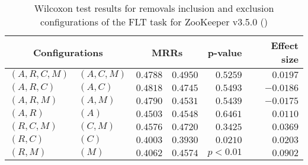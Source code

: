 
\begin{table}
\begin{spacing}{1.2}
\centering
\caption{Wilcoxon test results for removals inclusion and exclusion configurations of the FLT task for ZooKeeper v3.5.0 (\ctwo)}
\label{table:versus-wilcox-zookeeper-flt-removals}
\begin{tabular}{ll|rr|rr}
\toprule
      \multicolumn{2}{c|}{Configurations} &                \multicolumn{2}{c|}{MRRs} &             p-value & Effect size \\
\midrule
 $(A,R,C,M)$ &  $(A,C,M)$ &       $0.4788$ &  $\bm{0.4950}$ & $0.5259$ &    $0.0197$ \\
   $(A,R,C)$ &    $(A,C)$ &  $\bm{0.4818}$ &       $0.4745$ & $0.5493$ &   $-0.0186$ \\
   $(A,R,M)$ &    $(A,M)$ &  $\bm{0.4790}$ &       $0.4531$ & $0.5439$ &   $-0.0175$ \\
     $(A,R)$ &      $(A)$ &       $0.4503$ &  $\bm{0.4548}$ & $0.6461$ &    $0.0110$ \\
   $(R,C,M)$ &    $(C,M)$ &       $0.4576$ &  $\bm{0.4720}$ & $0.3425$ &    $0.0369$ \\
     $(R,C)$ &      $(C)$ &  $\bm{0.4003}$ &       $0.3930$ & $0.0210$ &    $0.0203$ \\
     $(R,M)$ &      $(M)$ &       $0.4062$ &  $\bm{0.4574}$ & $p<0.01$ &    $0.0902$ \\
\bottomrule
\end{tabular}

\end{spacing}
\end{table}


